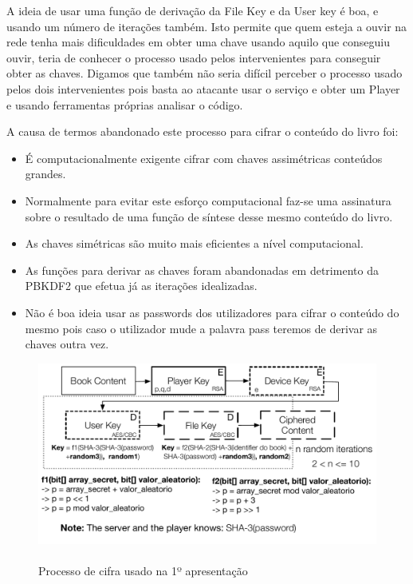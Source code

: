 \documentclass[pdftex,12pt,a4paper]{report}
\begin{document}
A ideia de usar uma função de derivação da File Key e da User key é boa, e usando um número de iterações também. Isto permite que quem esteja a ouvir na rede tenha mais dificuldades em obter uma chave usando aquilo que conseguiu ouvir, teria de conhecer o processo usado pelos intervenientes para conseguir obter as chaves. Digamos que também não seria difícil perceber o processo usado pelos dois intervenientes pois basta ao atacante usar o serviço e obter um Player e usando ferramentas próprias analisar o código.

A causa de termos abandonado este processo para cifrar o conteúdo do livro foi:

\begin{itemize}  
        \item É computacionalmente exigente cifrar com chaves assimétricas conteúdos grandes.
        \item Normalmente para evitar este esforço computacional faz-se uma assinatura sobre o resultado de uma função de síntese desse mesmo conteúdo do livro.
        \item As chaves simétricas são muito mais eficientes a nível computacional.
        \item As funções para derivar as chaves foram abandonadas em detrimento da PBKDF2 que efetua já as iterações idealizadas.
        \item Não é boa ideia usar as passwords dos utilizadores para cifrar o conteúdo do mesmo pois caso o utilizador mude a palavra pass teremos de derivar as chaves outra vez.
\pagebreak
                
\end{itemize}

\begin{figure}[!htb]
\center
 \includegraphics[width=135mm,scale=1]{filekey-initial-crypt.pdf}
 \caption{\\Processo de cifra usado na 1º apresentação}\label{fig:eer}
\end{figure}
\end{document}
